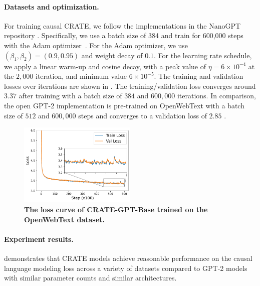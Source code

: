 \documentclass[../../book-main.tex]{subfiles}
\begin{document}
\paragraph{Datasets and optimization.} For training causal CRATE, we follow the implementations in the NanoGPT repository \citep{nanogpt}. Specifically, we use a batch size of 384 and train for 600,000 steps with the Adam optimizer~\citep{kingma2014adam}. For the Adam optimizer, we use $(\beta_1, \beta_2)=(0.9, 0.95)$ and weight decay of $0.1$. For the learning rate schedule, we apply a linear warm-up and cosine decay, with a peak value of $\eta=6\times 10^{-4}$ at the $2,000$ iteration, and minimum value $6\times 10^{-5}$. The training and validation losses over iterations are shown in . The training/validation loss converges around $3.37$ after training with a batch size of $384$ and $600,000$ iterations. In comparison, the open GPT-2 implementation is pre-trained on OpenWebText with a batch size of $512$ and $600,000$ steps and converges to a validation loss of $2.85$ \citep{nanogpt}.  

\begin{figure}
    \centering
    \includegraphics[width=0.5\textwidth]{figs_chap7/gpt-loss.pdf}
    \caption{\bf The loss curve of CRATE-GPT-Base trained on the OpenWebText dataset.}
    \label{fig:crate-text-evals}
\end{figure}

\paragraph{Experiment results.}

 demonstrates that CRATE models achieve reasonable performance on the causal language modeling loss across a variety of datasets compared to GPT-2 models with similar parameter counts and similar architectures.
\end{document}
